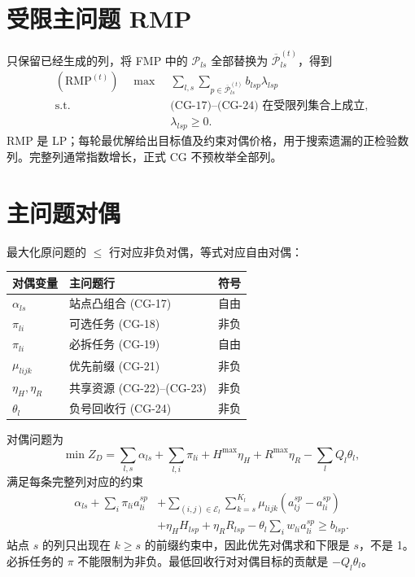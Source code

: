 \documentclass[UTF8,a4paper,11pt]{ctexart}
\newcommand{\cg}[1]{\tag{CG-#1}}
\begin{document}
\section{受限主问题 RMP}
只保留已经生成的列，将 FMP 中的 $\mathcal P_{ls}$ 全部替换为 $\overline{\mathcal P}_{ls}^{(t)}$，得到
\begin{equation}
\begin{aligned}
(\mathrm{RMP}^{(t)})\quad\max\;&\sum_{l,s}\sum_{p\in\overline{\mathcal P}_{ls}^{(t)}}b_{lsp}\lambda_{lsp}\\
\mathrm{s.t.}\;&\text{(CG-17)--(CG-24) 在受限列集合上成立},\\
&\lambda_{lsp}\geq0.
\end{aligned}\cg{27}
\end{equation}
RMP 是 LP；每轮最优解给出目标值及约束对偶价格，用于搜索遗漏的正检验数列。完整列通常指数增长，正式 CG 不预枚举全部列。

\section{主问题对偶}
最大化原问题的 $\leq$ 行对应非负对偶，等式对应自由对偶：
\begin{center}\begin{tabular}{lll}
\toprule 对偶变量 & 主问题行 & 符号\\\midrule
$\alpha_{ls}$ & 站点凸组合 (CG-17) & 自由\\
$\pi_{li}$ & 可选任务 (CG-18) & 非负\\
$\pi_{li}$ & 必拆任务 (CG-19) & 自由\\
$\mu_{lijk}$ & 优先前缀 (CG-21) & 非负\\
$\eta_H,\eta_R$ & 共享资源 (CG-22)--(CG-23) & 非负\\
$\theta_l$ & 负号回收行 (CG-24) & 非负\\\bottomrule
\end{tabular}\end{center}
对偶问题为
\begin{equation}
\min Z_D=\sum_{l,s}\alpha_{ls}+\sum_{l,i}\pi_{li}
+H^{\max}\eta_H+R^{\max}\eta_R-\sum_l Q_l\theta_l,\cg{28}
\end{equation}
满足每条完整列对应的约束
\begin{equation}
\begin{aligned}
\alpha_{ls}+\sum_i\pi_{li}a_{li}^{sp}
&+\sum_{(i,j)\in\mathcal E_l}\sum_{k=s}^{K_l}\mu_{lijk}(a_{lj}^{sp}-a_{li}^{sp})\\
&+\eta_HH_{lsp}+\eta_RR_{lsp}-\theta_l\sum_iw_{li}a_{li}^{sp}\geq b_{lsp}.
\end{aligned}\cg{29}
\end{equation}
站点 $s$ 的列只出现在 $k\geq s$ 的前缀约束中，因此优先对偶求和下限是 $s$，不是 1。必拆任务的 $\pi$ 不能限制为非负。最低回收行对对偶目标的贡献是 $-Q_l\theta_l$。
\end{document}
